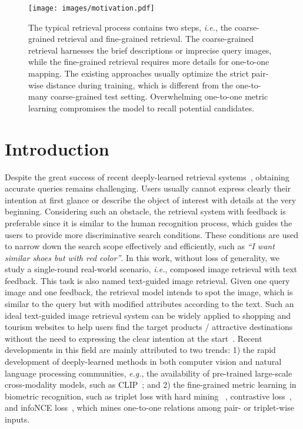 \documentclass[10pt,twocolumn,letterpaper]{article}
\def\eg{\emph{e.g.}}
\def\ie{\emph{i.e.}}
\begin{document}
\begin{figure}[t]
\begin{center}\vspace{-.1in}
     \texttt{[image: images/motivation.pdf]}
\end{center} \vspace{-.25in}
      \caption{ The typical retrieval process contains two steps, \ie, the coarse-grained retrieval and fine-grained retrieval.
      The coarse-grained retrieval harnesses the brief descriptions or imprecise query images, while the fine-grained retrieval requires more details for one-to-one mapping. 
      The existing approaches usually optimize the strict pair-wise distance during training, which is different from the one-to-many coarse-grained test setting. Overwhelming one-to-one metric learning compromises the model to recall potential candidates. 
      }
      \label{fig:motivation}\vspace{-.1in}
\end{figure}


\section{Introduction}\label{sec:introduction}
Despite the great success of recent deeply-learned retrieval systems~\cite{radenovic2018fine, zheng2017sift, zheng2020dual}, obtaining accurate queries remains challenging. Users usually cannot express clearly their intention at first glance or describe the object of interest with details at the very beginning. 
Considering such an obstacle, the retrieval system with feedback is preferable since it is similar to the human recognition process, which guides the users to provide more discriminative search conditions. These conditions are used to narrow down the search scope effectively and efficiently, such as \emph{``I want similar shoes but with red color''}. In this work, without loss of generality, we study a single-round real-world scenario, \ie, composed image retrieval with text feedback. This task is also named text-guided image retrieval. Given one query image and one feedback, the retrieval model intends to spot the image, which is similar to the query but with modified attributes according to the text. 
Such an ideal text-guided image retrieval system can be widely applied to shopping and tourism websites to help users find the target products / attractive destinations without the need to expressing the clear intention at the start~\cite{liu2012street}. 
Recent developments in this field are mainly attributed to two trends: 1) the rapid development of deeply-learned methods in both computer vision and natural language processing communities, \eg, the availability of pre-trained large-scale cross-modality models, such as CLIP~\cite{clip};
and 2) the fine-grained metric learning in biometric recognition, such as triplet loss with hard mining ~\cite{hermans2017defense, oh2016deep}, contrastive loss~\cite{zheng2017discriminatively}, and infoNCE loss~\cite{oord2018representation,han2022fashionvil}, which mines one-to-one relations among pair- or triplet-wise inputs.
\end{document}
